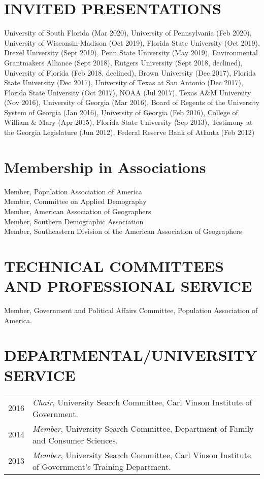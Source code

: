 \documentclass[letterpaper,11pt]{article}
\begin{document}
\section{INVITED PRESENTATIONS}
University of South Florida (Mar 2020), University of Pennsylvania (Feb 2020), University of Wisconsin-Madison (Oct 2019), Florida State University (Oct 2019), Drexel University (Sept 2019), Penn State University (May 2019), Environmental Grantmakers Alliance (Sept 2018), Rutgers University (Sept 2018, declined), University of Florida (Feb 2018, declined), Brown University (Dec 2017), Florida State University (Dec 2017), University of Texas at San Antonio (Dec 2017), Florida State University (Oct 2017), NOAA (Jul 2017), Texas A\&M University (Nov 2016), University of Georgia (Mar 2016), Board of Regents of the University System of Georgia (Jan 2016), University of Georgia (Feb 2016), College of William \& Mary (Apr 2015), Florida State University (Sep 2013), Testimony at the Georgia Legislature (Jun 2012), Federal Reserve Bank of Atlanta (Feb 2012)

\section{Membership in Associations}
Member, Population Association of America\\
Member, Committee on Applied Demography\\
Member, American Association of Geographers\\
Member, Southern Demographic Association\\
Member, Southeastern Division of the American Association of Geographers

\section{TECHNICAL COMMITTEES AND PROFESSIONAL SERVICE}
Member, Government and Political Affairs Committee, Population Association of America.
% 


\section{DEPARTMENTAL/UNIVERSITY SERVICE}
\begin{tabularx}{\linewidth}{lX}
2016 & \textit{Chair}, University Search Committee, Carl Vinson Institute of Government.\\
2014 & \textit{Member}, University Search Committee, Department of Family and Consumer Sciences.\\
2013 & \textit{Member}, University Search Committee, Carl Vinson Institute of Government's Training Department.\\
\end{tabularx}
\end{document}
